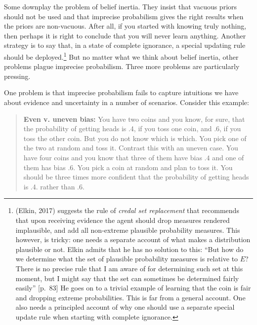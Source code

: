 \documentclass[
  10pt,
  dvipsnames,enabledeprecatedfontcommands]{scrartcl}
\begin{document}
Some downplay the problem of belief inertia. They insist that vacuous
priors should not be used and that imprecise probabilism gives the right
results when the priors are non-vacuous. After all, if you started with
knowing truly nothing, then perhaps it is right to conclude that you
will never learn anything. Another strategy is to say that, in a state
of complete ignorance, a special updating rule should be
deployed.\footnote{(Elkin, 2017) suggests the rule of
  \emph{credal set replacement} that recommends that upon receiving
  evidence the agent should drop measures rendered implausible, and add
  all non-extreme plausible probability measures. This however, is
  tricky: one needs a separate account of what makes a distribution
  plausible or not. Elkin admits that he has no solution to this: ``But
  how do we determine what the set of plausible probability measures is
  relative to \(E\)? There is no precise rule that I am aware of for
  determining such set at this moment, but I might say that the set can
  sometimes be determined fairly easily'' {[}p.~83{]} He goes on to a
  trivial example of learning that the coin is fair and dropping extreme
  probabilities. This is far from a general account. One also needs a
  principled account of why one should use a separate special update
  rule when starting with complete ignorance.} But no matter what we
think about belief inertia, other problems plague imprecise probabilism.
Three more problems are particularly pressing.

One problem is that imprecise probabilism fails to capture intuitions we
have about evidence and uncertainty in a number of scenarios. Consider
this example:

\begin{quote}
\textbf{Even v. uneven bias:}
 You have two coins and you know, for sure, that the probability of getting heads is .4, if you toss one coin, and .6, if you toss the other coin. But you do not know which is which. You pick one of the two at random and toss it.  Contrast this with an uneven case. You have four coins and you know that three of them have bias $.4$ and one of them has bias $.6$. You pick a coin at random and plan to toss it. You should be three times more confident that the probability of getting heads is .4. rather than .6.
\end{quote}
\end{document}
